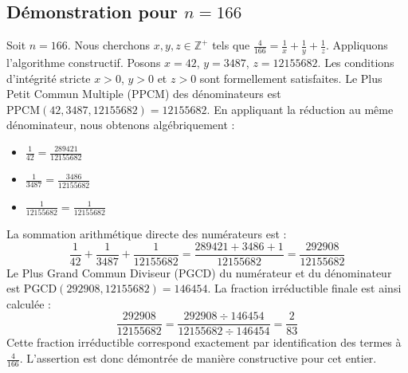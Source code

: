 \documentclass[11pt,a4paper]{article}
\begin{document}
\subsection{Démonstration pour $n = 166$}
Soit $n = 166$. Nous cherchons $x, y, z \in \mathbb{Z}^{+}$ tels que $\frac{4}{166} = \frac{1}{x} + \frac{1}{y} + \frac{1}{z}$.
Appliquons l'algorithme constructif. Posons $x = 42$, $y = 3487$, $z = 12155682$.
Les conditions d'intégrité stricte $x > 0$, $y > 0$ et $z > 0$ sont formellement satisfaites.
Le Plus Petit Commun Multiple (PPCM) des dénominateurs est $\text{PPCM}(42, 3487, 12155682) = 12155682$.
En appliquant la réduction au même dénominateur, nous obtenons algébriquement :
\begin{itemize}
    \item $\frac{1}{42} = \frac{289421}{12155682}$
    \item $\frac{1}{3487} = \frac{3486}{12155682}$
    \item $\frac{1}{12155682} = \frac{1}{12155682}$
\end{itemize}
La sommation arithmétique directe des numérateurs est :
$$ \frac{1}{42} + \frac{1}{3487} + \frac{1}{12155682} = \frac{289421 + 3486 + 1}{12155682} = \frac{292908}{12155682} $$
Le Plus Grand Commun Diviseur (PGCD) du numérateur et du dénominateur est $\text{PGCD}(292908, 12155682) = 146454$.
La fraction irréductible finale est ainsi calculée :
$$ \frac{292908}{12155682} = \frac{292908 \div 146454}{12155682 \div 146454} = \frac{2}{83} $$
Cette fraction irréductible correspond exactement par identification des termes à $\frac{4}{166}$. L'assertion est donc démontrée de manière constructive pour cet entier.
\end{document}
